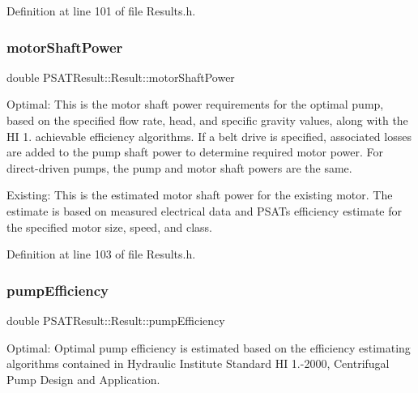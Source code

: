 Definition at line 101 of file Results.\+h.

\mbox{\label{struct_p_s_a_t_result_1_1_result_a75bfbaf59bbc736b53936069bcaf622a}} 
\subsubsection{\texorpdfstring{motor\+Shaft\+Power}{motorShaftPower}}
{\footnotesize\ttfamily double P\+S\+A\+T\+Result\+::\+Result\+::motor\+Shaft\+Power}



Optimal\+: This is the motor shaft power requirements for the optimal pump, based on the specified flow rate, head, and specific gravity values, along with the HI 1. achievable efficiency algorithms. If a belt drive is specified, associated losses are added to the pump shaft power to determine required motor power. For direct-\/driven pumps, the pump and motor shaft powers are the same. 

Existing\+: This is the estimated motor shaft power for the existing motor. The estimate is based on measured electrical data and P\+S\+AT\textquotesingle{}s efficiency estimate for the specified motor size, speed, and class. 

Definition at line 103 of file Results.\+h.

\mbox{\label{struct_p_s_a_t_result_1_1_result_a6b194eedbd6d31390928e1b4feab922b}} 
\subsubsection{\texorpdfstring{pump\+Efficiency}{pumpEfficiency}}
{\footnotesize\ttfamily double P\+S\+A\+T\+Result\+::\+Result\+::pump\+Efficiency}



Optimal\+: Optimal pump efficiency is estimated based on the efficiency estimating algorithms contained in Hydraulic Institute Standard HI 1.-\/2000, Centrifugal Pump Design and Application. 

